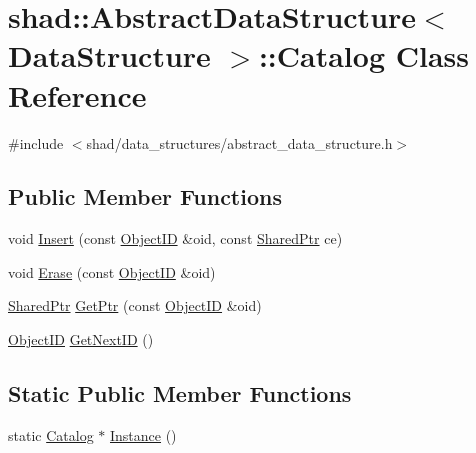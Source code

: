 \hypertarget{classshad_1_1AbstractDataStructure_1_1Catalog}{\section{shad\-:\-:Abstract\-Data\-Structure$<$ Data\-Structure $>$\-:\-:Catalog Class Reference}
\label{classshad_1_1AbstractDataStructure_1_1Catalog}
}


{\ttfamily \#include $<$shad/data\-\_\-structures/abstract\-\_\-data\-\_\-structure.\-h$>$}

\subsection*{Public Member Functions}
\begin{DoxyCompactItemize}
\item 
void \hyperlink{classshad_1_1AbstractDataStructure_1_1Catalog_a1e2b195f0047a90bbc375443c7de7e23}{Insert} (const \hyperlink{classshad_1_1AbstractDataStructure_a8772079d2686692828cfbf342cc2b594}{Object\-I\-D} \&oid, const \hyperlink{classshad_1_1AbstractDataStructure_a8bb29450966955c546d40421ce46316f}{Shared\-Ptr} ce)
\item 
void \hyperlink{classshad_1_1AbstractDataStructure_1_1Catalog_a2e551228f9c8b9a7762eb351a11cf99e}{Erase} (const \hyperlink{classshad_1_1AbstractDataStructure_a8772079d2686692828cfbf342cc2b594}{Object\-I\-D} \&oid)
\item 
\hyperlink{classshad_1_1AbstractDataStructure_a8bb29450966955c546d40421ce46316f}{Shared\-Ptr} \hyperlink{classshad_1_1AbstractDataStructure_1_1Catalog_a776520c4f9060fc8c9128ac63e8a3753}{Get\-Ptr} (const \hyperlink{classshad_1_1AbstractDataStructure_a8772079d2686692828cfbf342cc2b594}{Object\-I\-D} \&oid)
\item 
\hyperlink{classshad_1_1AbstractDataStructure_a8772079d2686692828cfbf342cc2b594}{Object\-I\-D} \hyperlink{classshad_1_1AbstractDataStructure_1_1Catalog_a5bf01b25dbb91f77b9b03866dedeb06a}{Get\-Next\-I\-D} ()
\end{DoxyCompactItemize}
\subsection*{Static Public Member Functions}
\begin{DoxyCompactItemize}
\item 
static \hyperlink{classshad_1_1AbstractDataStructure_1_1Catalog}{Catalog} $\ast$ \hyperlink{classshad_1_1AbstractDataStructure_1_1Catalog_a13204d5ff4497f03b438f9cf9ff6253e}{Instance} ()
\end{DoxyCompactItemize}


